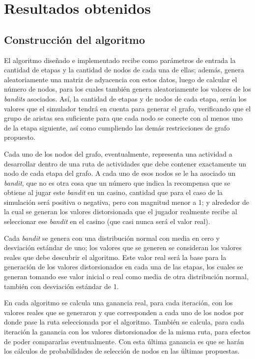 \chapter{Resultados obtenidos}
\label{resul}

\section{Construcción del algoritmo}
El algoritmo diseñado e implementado recibe como parámetros de entrada la cantidad de etapas y la cantidad de nodos de cada una de ellas; además, genera aleatoriamente una matriz de adyacencia con estos datos, luego de calcular el número de nodos, para los cuales también genera aleatoriamente los valores de los \textit{bandits} asociados. Así, la cantidad de etapas y de nodos de cada etapa, serán los valores que el simulador tendrá en cuenta para generar el grafo, verificando que el grupo de aristas sea suficiente para que cada nodo se conecte con al menos uno de la etapa siguiente, así como cumpliendo las demás restricciones de grafo propuesto. 

Cada uno de los nodos del grafo, eventualmente, representa una actividad a desarrollar dentro de una ruta de actividades que debe contener exactamente un nodo de cada etapa del grafo. A cada uno de esos nodos se le ha asociado un \textit{bandit}, que no es otra cosa que un número que indica la recompensa que se obtiene al jugar este \textit{bandit} en un casino, cantidad que para el caso de la simulación será positiva o negativa, pero con magnitud menor a 1; y alrededor de la cual se generan los valores distorsionada que el jugador realmente recibe al seleccionar ese \textit{bandit} en el casino (que casi nunca será el valor real).

Cada \textit{bandit} se genera con una distribución normal con media en cero y desviación estándar de uno; los valores que se generen se consideran los valores reales que debe descubrir el algoritmo. Este valor real será la base para la generación de los valores distorsionados en cada una de las etapas, los cuales se generan tomando ese valor inicial o real como media de otra distribución normal, también con desviación estándar de 1.

En cada algoritmo se calcula una ganancia real, para cada iteración, con los valores reales que se generaron y que corresponden a cada uno de los nodos por donde pase la ruta seleccionada por el algoritmo. También se calcula, para cada iteración la ganancia con los valores distorsionados de la misma ruta, para efectos de poder compararlas eventualmente. Con esta última ganancia es que se harán los cálculos de probabilidades de selección de nodos en las últimas propuestas.

